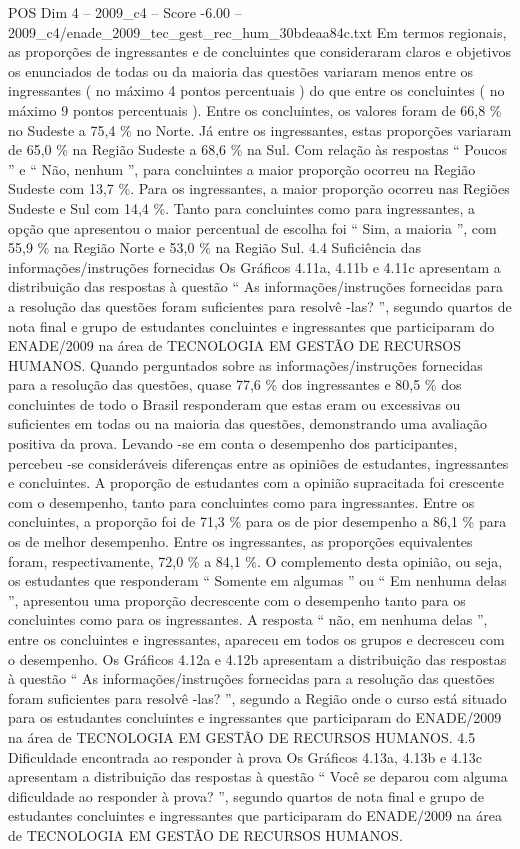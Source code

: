\begin{textsample}{POS Dim 4 – 2009\_c4 – Score -6.00 – 2009\_c4/enade\_2009\_tec\_gest\_rec\_hum\_30bdeaa84c.txt}
Em termos regionais, as proporções de ingressantes e de concluintes que consideraram claros e objetivos os enunciados de todas ou da maioria das questões variaram menos entre os ingressantes ( no máximo 4 pontos percentuais ) do que entre os concluintes ( no máximo 9 pontos percentuais ).
Entre os concluintes, os valores foram de 66,8 \% no Sudeste a 75,4 \% no Norte.
Já entre os ingressantes, estas proporções variaram de 65,0 \% na Região Sudeste a 68,6 \% na Sul.
Com relação às respostas “ Poucos ” e “ Não, nenhum ”, para concluintes a maior proporção ocorreu na Região Sudeste com 13,7 \%.
Para os ingressantes, a maior proporção ocorreu nas Regiões Sudeste e Sul com 14,4 \%.
Tanto para concluintes como para ingressantes, a opção que apresentou o maior percentual de escolha foi “ Sim, a maioria ”, com 55,9 \% na Região Norte e 53,0 \% na Região Sul. 4.4 Suficiência das informações/instruções fornecidas Os Gráficos 4.11a, 4.11b e 4.11c apresentam a distribuição das respostas à questão “ As informações/instruções fornecidas para a resolução das questões foram suficientes para resolvê -las? ”, segundo quartos de nota final e grupo de estudantes concluintes e ingressantes que participaram do ENADE/2009 na área de TECNOLOGIA EM GESTÃO DE RECURSOS HUMANOS.
Quando perguntados sobre as informações/instruções fornecidas para a resolução das questões, quase 77,6 \% dos ingressantes e 80,5 \% dos concluintes de todo o Brasil responderam que estas eram ou excessivas ou suficientes em todas ou na maioria das questões, demonstrando uma avaliação positiva da prova.
Levando -se em conta o desempenho dos participantes, percebeu -se consideráveis diferenças entre as opiniões de estudantes, ingressantes e concluintes.
A proporção de estudantes com a opinião supracitada foi crescente com o desempenho, tanto para concluintes como para ingressantes.
Entre os concluintes, a proporção foi de 71,3 \% para os de pior desempenho a 86,1 \% para os de melhor desempenho.
Entre os ingressantes, as proporções equivalentes foram, respectivamente, 72,0 \% a 84,1 \%.
O complemento desta opinião, ou seja, os estudantes que responderam “ Somente em algumas ” ou “ Em nenhuma delas ”, apresentou uma proporção decrescente com o desempenho tanto para os concluintes como para os ingressantes.
A resposta “ não, em nenhuma delas ”, entre os concluintes e ingressantes, apareceu em todos os grupos e decresceu com o desempenho.
Os Gráficos 4.12a e 4.12b apresentam a distribuição das respostas à questão “ As informações/instruções fornecidas para a resolução das questões foram suficientes para resolvê -las? ”, segundo a Região onde o curso está situado para os estudantes concluintes e ingressantes que participaram do ENADE/2009 na área de TECNOLOGIA EM GESTÃO DE RECURSOS HUMANOS. 4.5 Dificuldade encontrada ao responder à prova Os Gráficos 4.13a, 4.13b e 4.13c apresentam a distribuição das respostas à questão “ Você se deparou com alguma dificuldade ao responder à prova? ”, segundo quartos de nota final e grupo de estudantes concluintes e ingressantes que participaram do ENADE/2009 na área de TECNOLOGIA EM GESTÃO DE RECURSOS HUMANOS.

\end{textsample}
